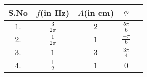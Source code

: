   \begin{tabular}{|c|c|c|c|c|}
        \hline
        \textbf{S.No} & \textbf{$f$(in Hz)} &\textbf{$A$(in cm)}&\textbf{$\phi$}\\
        \hline
        $1.$ & $\frac{3}{2\pi}$&$2$ & $\frac{5\pi}{6}$\\
         \hline
        $2.$ & $\frac{1}{2\pi}$ &$1$&$\frac{-\pi}{6}$\\
        \hline
        $3.$ & $1$ & $3$&$\frac{3\pi}{4}$\\
        \hline
        $4.$ & $\frac{1}{2}$ & $1$&$0$\\
        \hline
    \end{tabular}
 
